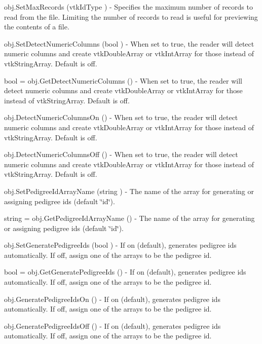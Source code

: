\begin{DoxyItemize}
\item {\ttfamily obj.\-Set\-Max\-Records (vtk\-Id\-Type )} -\/ Specifies the maximum number of records to read from the file. Limiting the number of records to read is useful for previewing the contents of a file.  
\item {\ttfamily obj.\-Set\-Detect\-Numeric\-Columns (bool )} -\/ When set to true, the reader will detect numeric columns and create vtk\-Double\-Array or vtk\-Int\-Array for those instead of vtk\-String\-Array. Default is off.  
\item {\ttfamily bool = obj.\-Get\-Detect\-Numeric\-Columns ()} -\/ When set to true, the reader will detect numeric columns and create vtk\-Double\-Array or vtk\-Int\-Array for those instead of vtk\-String\-Array. Default is off.  
\item {\ttfamily obj.\-Detect\-Numeric\-Columns\-On ()} -\/ When set to true, the reader will detect numeric columns and create vtk\-Double\-Array or vtk\-Int\-Array for those instead of vtk\-String\-Array. Default is off.  
\item {\ttfamily obj.\-Detect\-Numeric\-Columns\-Off ()} -\/ When set to true, the reader will detect numeric columns and create vtk\-Double\-Array or vtk\-Int\-Array for those instead of vtk\-String\-Array. Default is off.  
\item {\ttfamily obj.\-Set\-Pedigree\-Id\-Array\-Name (string )} -\/ The name of the array for generating or assigning pedigree ids (default \char`\"{}id\char`\"{}).  
\item {\ttfamily string = obj.\-Get\-Pedigree\-Id\-Array\-Name ()} -\/ The name of the array for generating or assigning pedigree ids (default \char`\"{}id\char`\"{}).  
\item {\ttfamily obj.\-Set\-Generate\-Pedigree\-Ids (bool )} -\/ If on (default), generates pedigree ids automatically. If off, assign one of the arrays to be the pedigree id.  
\item {\ttfamily bool = obj.\-Get\-Generate\-Pedigree\-Ids ()} -\/ If on (default), generates pedigree ids automatically. If off, assign one of the arrays to be the pedigree id.  
\item {\ttfamily obj.\-Generate\-Pedigree\-Ids\-On ()} -\/ If on (default), generates pedigree ids automatically. If off, assign one of the arrays to be the pedigree id.  
\item {\ttfamily obj.\-Generate\-Pedigree\-Ids\-Off ()} -\/ If on (default), generates pedigree ids automatically. If off, assign one of the arrays to be the pedigree id.  

\end{DoxyItemize}
